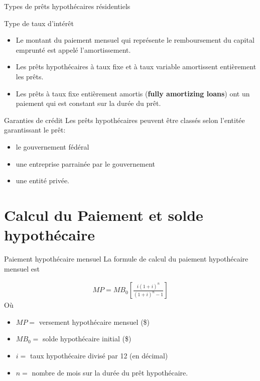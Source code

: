 \documentclass[10pt,a4paper]{beamer}
\begin{document}
\begin{frame}{Types de prêts hypothécaires résidentiels}
\begin{block}{Type de taux d'intérêt}
\begin{itemize}[label=\bullet]
\item Le montant du paiement mensuel qui représente le remboursement du capital emprunté est appelé l'amortissement.
\item Les prêts hypothécaires à taux fixe et à taux variable amortissent entièrement les prêts.
\item Les prêts à taux fixe entièrement amortis (\textbf{fully amortizing loans}) ont un paiement qui est constant sur la durée du prêt. 
\end{itemize}
\end{block}
\begin{block}{Garanties de crédit}
Les prêts hypothécaires peuvent être classés selon l'entitée garantissant le prêt: 
\begin{itemize}[label=\bullet]
\item le gouvernement fédéral
\item une entreprise parrainée par le gouvernement 
\item une entité privée. 
\end{itemize}
\end{block}
\end{frame}



\section{Calcul du Paiement et solde hypothécaire}

\begin{frame}{Paiement hypothécaire mensuel}
La formule de calcul du paiement hypothécaire mensuel est

\begin{align*}
MP=MB_0 \left[ \frac{i(1+i)^n}{(1+i)^n-1} \right]
\end{align*}
Où
\begin{itemize}[label=\bullet]
\item $MP =$ versement hypothécaire mensuel (\$)
\item $MB_0 =$ solde hypothécaire initial (\$)
\item $i =$ taux hypothécaire divisé par 12 (en décimal)
\item $n =$ nombre de mois sur la durée du prêt hypothécaire.
\end{itemize}
\end{frame}
\end{document}
